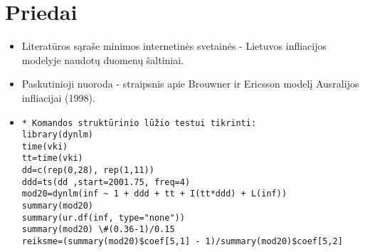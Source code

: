 \documentclass[a4paper]{article}
\begin{document}
\newpage
\section{Priedai}
\begin{itemize}
\item{Literatūros sąraše minimos internetinės svetainės - Lietuvos infliacijos modelyje naudotų duomenų šaltiniai.}\\
\item{Paskutinioji nuoroda - straipsnis apie Brouwner ir Ericsson modelį Ausralijos infliacijai (1998).}
\item{
\begin{verbatim}
* Komandos struktūrinio lūžio testui tikrinti:
library(dynlm)
time(vki)
tt=time(vki)
dd=c(rep(0,28), rep(1,11))
ddd=ts(dd ,start=2001.75, freq=4)
mod20=dynlm(inf ~ 1 + ddd + tt + I(tt*ddd) + L(inf))
summary(mod20)
summary(ur.df(inf, type="none"))
summary(mod20) \#(0.36-1)/0.15
reiksme=(summary(mod20)$coef[5,1] - 1)/summary(mod20)$coef[5,2]
\end{verbatim}
}
\end{itemize}
\end{document}
